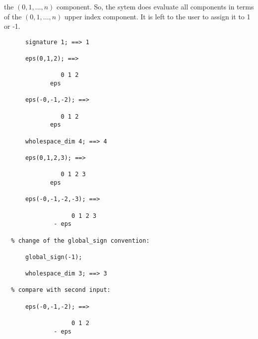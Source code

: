 the $(0,1,\ldots,n)$ component. So, the sytem does evaluate all components
in terms of  the $(0,1,\ldots,n)$ upper index component. It is left to the user
to assign it to 1 or -1.
\begin{verbatim}
      signature 1; ==> 1

      eps(0,1,2); ==>

                0 1 2
             eps

      eps(-0,-1,-2); ==>

                0 1 2
             eps

      wholespace_dim 4; ==> 4

      eps(0,1,2,3); ==>

                0 1 2 3
             eps

      eps(-0,-1,-2,-3); ==>

                   0 1 2 3
              - eps

  % change of the global_sign convention:

      global_sign(-1);

      wholespace_dim 3; ==> 3

  % compare with second input:

      eps(-0,-1,-2); ==>

                   0 1 2
              - eps
\end{verbatim}

